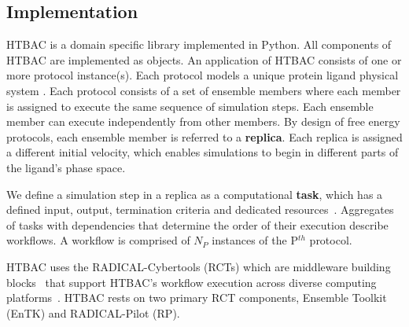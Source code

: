 


\subsection{Implementation}


HTBAC is a domain specific library implemented in Python. All components of 
HTBAC are implemented as objects. An application of HTBAC consists of one or 
more protocol instance(s). Each protocol models a unique protein ligand physical 
system . 
Each protocol consists of a set of ensemble members where each member is 
assigned to execute the same sequence of simulation steps. Each ensemble member 
can execute independently from other members. By design of free energy 
protocols, each ensemble member is referred to a \textbf{replica}. Each 
replica is assigned a different initial velocity, which enables simulations to 
begin in different parts of the ligand's phase space. 

We define a simulation step in a replica as a computational \textbf{task}, which 
has a defined input, output, termination criteria and dedicated 
resources~\cite{power-of-many17}. Aggregates of tasks with dependencies that 
determine the order of their execution describe workflows. A workflow is 
comprised of $N_P$ instances of the P$^{th}$ protocol.

HTBAC uses the RADICAL-Cybertools (RCTs) which are middleware building 
blocks~\cite{review_bb_2016} that support HTBAC's workflow execution across 
diverse computing platforms~\cite{turilli2017comprehensive}. HTBAC rests on two 
primary RCT components, Ensemble Toolkit (EnTK) and RADICAL-Pilot (RP).

